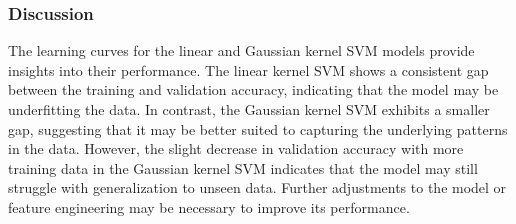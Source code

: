 \documentclass[11pt,a4paper]{article}
\begin{document}
\subsubsection{Discussion}

The learning curves  for the linear and Gaussian kernel SVM models provide insights into their performance.
The linear kernel SVM shows a consistent gap between the training and validation accuracy, indicating that the model may be underfitting the data.
In contrast, the Gaussian kernel SVM exhibits a smaller gap, suggesting that it may be better suited to capturing the underlying patterns in the data.
However, the slight decrease in validation accuracy with more training data in the Gaussian kernel SVM indicates that the model may still struggle with generalization to unseen data.
Further adjustments to the model or feature engineering may be necessary to improve its performance.
\end{document}
